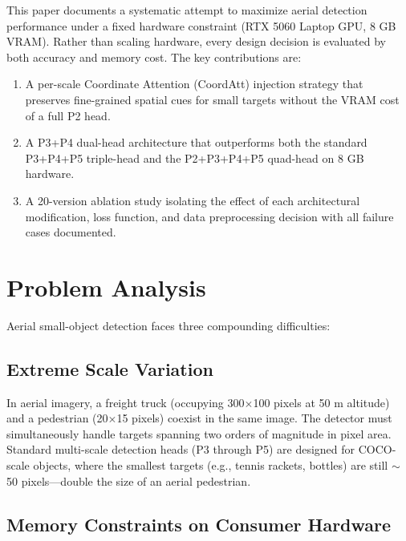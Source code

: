 \documentclass[11pt]{article}
\begin{document}
This paper documents a systematic attempt to maximize aerial detection performance under a fixed
hardware constraint (RTX 5060 Laptop GPU, 8 GB VRAM). Rather than scaling hardware, every design
decision is evaluated by both accuracy and memory cost. The key contributions are:

\begin{enumerate}[leftmargin=*]
    \item A per-scale Coordinate Attention (CoordAtt) injection strategy that preserves fine-grained
          spatial cues for small targets without the VRAM cost of a full P2 head.
    \item A P3+P4 dual-head architecture that outperforms both the standard P3+P4+P5 triple-head
          and the P2+P3+P4+P5 quad-head on 8 GB hardware.
    \item A 20-version ablation study isolating the effect of each architectural modification,
          loss function, and data preprocessing decision with all failure cases documented.
\end{enumerate}

\section{Problem Analysis}

Aerial small-object detection faces three compounding difficulties:

\subsection{Extreme Scale Variation}

In aerial imagery, a freight truck (occupying 300$\times$100 pixels at 50 m altitude) and a
pedestrian (20$\times$15 pixels) coexist in the same image. The detector must simultaneously
handle targets spanning two orders of magnitude in pixel area. Standard multi-scale detection
heads (P3 through P5) are designed for COCO-scale objects, where the smallest targets (e.g.,
tennis rackets, bottles) are still $\sim$50 pixels—double the size of an aerial pedestrian.

\subsection{Memory Constraints on Consumer Hardware}
\end{document}
